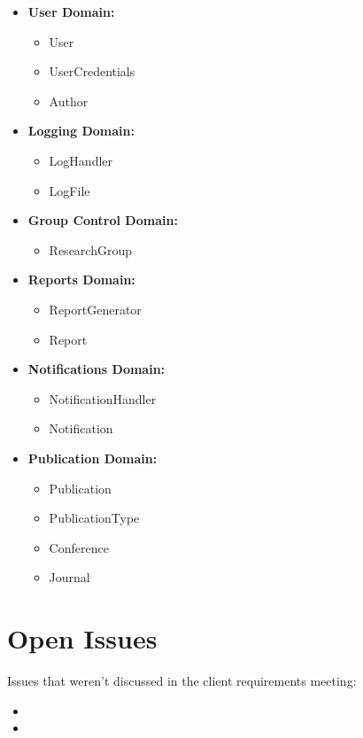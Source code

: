 \documentclass{article}
\begin{document}
		\begin{multicols}{2}
		
			\begin{itemize} 
				\item \textbf{User Domain:}
						\begin{itemize}
						\item User
						\item UserCredentials
						\item Author
						\end{itemize}
					
				\item \textbf{Logging Domain:}
						\begin{itemize}
						\item LogHandler
						\item LogFile
						\end{itemize}				
					
					
				\item \textbf{Group Control Domain:}
						\begin{itemize}
						\item ResearchGroup
						\end{itemize}
						
					\columnbreak

					
				\item \textbf{Reports Domain:}

						\begin{itemize}
						\item ReportGenerator
						\item Report
						\end{itemize}
					
				\item \textbf{Notifications Domain:}
						\begin{itemize}
						\item NotificationHandler
						\item Notification
						\end{itemize}

					
				\item \textbf{Publication Domain:}
						\begin{itemize}
						\item Publication
						\item PublicationType
						\item Conference
						\item Journal
						\end{itemize}		
				
			\end{itemize}
		\end{multicols}
	\cleardoublepage
	\section{Open Issues}\label{sec:issues}
	Issues that weren't discussed in the client requirements meeting:
		\begin{itemize}
		  \item 
		  \item 
		\end{itemize}
		
\end{document}
